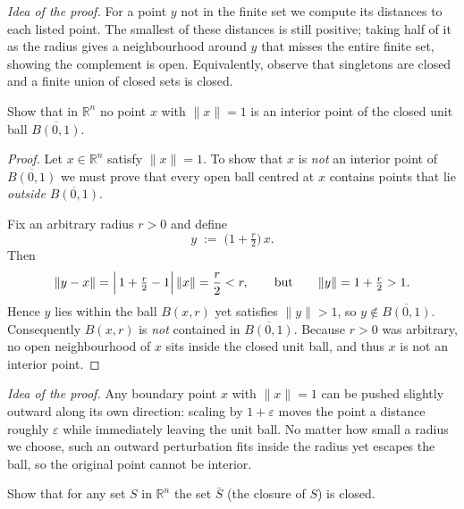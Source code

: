\documentclass[10pt]{extarticle}
\begin{document}
\begin{remark}
    \emph{Idea of the proof.}  For a point $y$ not in the finite set we compute its distances to each listed point.  The smallest of these distances is still positive; taking half of it as the radius gives a neighbourhood around $y$ that misses the entire finite set, showing the complement is open.  Equivalently, observe that singletons are closed and a finite union of closed sets is closed.
\end{remark}

\begin{exercise}[4.6]
    Show that in $\mathbb{R}^n$ no point $x$ with $\|x\|=1$ is an interior point of the closed unit ball $\overline{B(0,1)}$.
\end{exercise}

\begin{proof}
    Let $x\in\mathbb R^{n}$ satisfy $\|x\|=1$.  To show that $x$ is \emph{not} an interior point of $\overline{B(0,1)}$ we must prove that every open ball centred at $x$ contains points that lie \emph{outside} $\overline{B(0,1)}$.

    Fix an arbitrary radius $r>0$ and define
    $$
        y\;:=\;\bigl(1+\tfrac{r}{2}\bigr)\,x.
    $$
    Then
    $$
        \|y-x\|=\Bigl|\,1+\tfrac{r}{2}-1\Bigr|\,\|x\|=\frac{r}{2}<r,\qquad \text{but}\qquad \|y\|=1+\tfrac{r}{2}>1.
    $$
    Hence $y$ lies within the ball $B(x,r)$ yet satisfies $\|y\|>1$, so $y\notin\overline{B(0,1)}$.  Consequently $B(x,r)$ is \emph{not} contained in $\overline{B(0,1)}$.  Because $r>0$ was arbitrary, no open neighbourhood of $x$ sits inside the closed unit ball, and thus $x$ is not an interior point.
\end{proof}

\begin{remark}
    \emph{Idea of the proof.}  Any boundary point $x$ with $\|x\|=1$ can be pushed slightly outward along its own direction: scaling by $1+\varepsilon$ moves the point a distance roughly $\varepsilon$ while immediately leaving the unit ball.  No matter how small a radius we choose, such an outward perturbation fits inside the radius yet escapes the ball, so the original point cannot be interior.
\end{remark}

\begin{exercise}[4.7]
    Show that for any set $S$ in $\mathbb{R}^n$ the set $\bar{S}$ (the closure of $S$) is closed.
\end{exercise}
\end{document}
